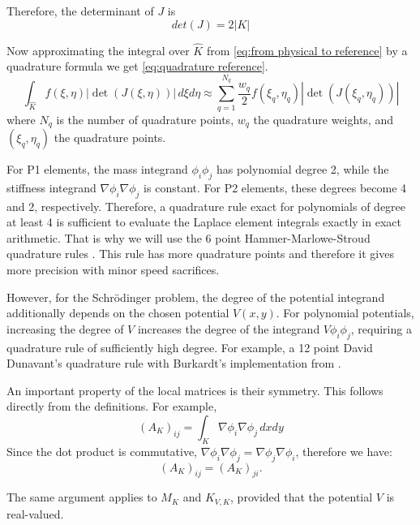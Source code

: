\documentclass[acmsmall,screen]{MapleTrans}
\begin{document}
Therefore, the determinant of $J$ is
\begin{equation}
    det(J) = 2|K|
\end{equation}

Now approximating the integral over $\hat{K}$ from \eqref{eq:from physical to reference} by a quadrature formula we get \eqref{eq:quadrature reference}.
\begin{equation}
    \int_{\hat{K}}f(\xi, \eta) |\det(J(\xi, \eta))| \, d\xi d\eta \approx
    \sum_{q=1}^{N_q} \frac{w_q}{2} f(\xi_q, \eta_q) |\det(J(\xi_q, \eta_q))|
    \label{eq:quadrature reference}
\end{equation}
where $N_q$ is the number of quadrature points, $w_q$ the quadrature weights, and $(\xi_q, \eta_q)$ the quadrature points.

For P1 elements, the mass integrand $\phi_i\phi_j$ has polynomial degree 2, while the stiffness integrand $\nabla\phi_i \nabla\phi_j$ is constant. For P2 elements, these degrees become 4 and 2, respectively. Therefore, a quadrature rule exact for polynomials of degree at least 4 is sufficient to evaluate the Laplace element integrals exactly in exact arithmetic. That is why we will use the 6 point Hammer-Marlowe-Stroud quadrature rules \cite{b16}. This rule has more quadrature points and therefore it gives more precision with minor speed sacrifices.

However, for the Schr\"{o}dinger problem, the degree of the potential integrand additionally depends on the chosen potential $V(x,y)$. For polynomial potentials, increasing the degree of $V$ increases the degree of the integrand $V\phi_i\phi_j$, requiring a quadrature rule of sufficiently high degree. For example, a 12 point David Dunavant's quadrature rule \cite{b17} with Burkardt's implementation from \cite{b18}.

An important property of the local matrices is their symmetry. This follows directly from the definitions. For example,
\begin{equation}
    (A_K)_{ij} = \int_K\nabla\phi_i \nabla\phi_j \, dxdy
\end{equation}
Since the dot product is commutative, $\nabla\phi_i \nabla\phi_j = \nabla\phi_j \nabla\phi_i$, therefore we have:
\begin{equation}
    (A_K)_{ij}=(A_K)_{ji}.
\end{equation}

The same argument applies to $M_K$ and $K_{V,K}$, provided that the potential $V$ is real-valued. 
\end{document}
